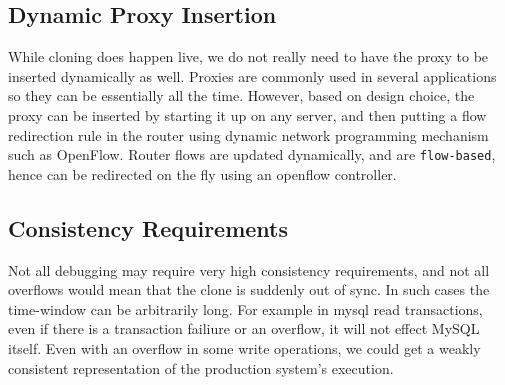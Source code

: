 \subsection{Dynamic Proxy Insertion}
\label{sec:dynamicProxyInsertion}

While cloning does happen live, we do not really need to have the proxy to be inserted dynamically as well. 
Proxies are commonly used in several applications so they can be essentially all the time. 
However, based on design choice, the proxy can be inserted by starting it up on any server, and then putting a flow redirection rule in the router using dynamic network programming mechanism such as OpenFlow\cite{openflow}.
Router flows are updated dynamically, and are \texttt{flow-based}, hence can be redirected on the fly using an openflow\cite{openflow} controller.



\subsection{Consistency Requirements}
\label{sec:consistency}

Not all debugging may require very high consistency requirements, and not all overflows would mean that the clone is suddenly out of sync.
In such cases the time-window can be arbitrarily long. 
For example in mysql read transactions, even if there is a transaction failiure or an overflow, it will not effect MySQL itself.
Even with an overflow in some write operations, we could get a weakly consistent representation of the production system's execution.
